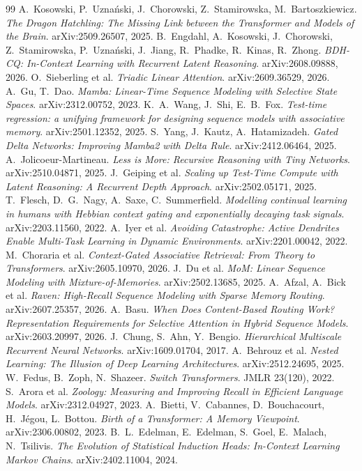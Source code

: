\documentclass[11pt]{article}
\begin{document}
\begin{thebibliography}{99}
\small
{} A.~Kosowski, P.~Uzna\'nski, J.~Chorowski, Z.~Stamirowska, M.~Bartoszkiewicz. \emph{The Dragon Hatchling: The Missing Link between the Transformer and Models of the Brain}. arXiv:2509.26507, 2025.
 B.~Engdahl, A.~Kosowski, J.~Chorowski, Z.~Stamirowska, P.~Uzna\'nski, J.~Jiang, R.~Phadke, R.~Kinas, R.~Zhong. \emph{BDH-CQ: In-Context Learning with Recurrent Latent Reasoning}. arXiv:2608.09888, 2026.
 O.~Sieberling et al. \emph{Triadic Linear Attention}. arXiv:2609.36529, 2026.
 A.~Gu, T.~Dao. \emph{Mamba: Linear-Time Sequence Modeling with Selective State Spaces}. arXiv:2312.00752, 2023.
 K.~A.~Wang, J.~Shi, E.~B.~Fox. \emph{Test-time regression: a unifying framework for designing sequence models with associative memory}. arXiv:2501.12352, 2025.
 S.~Yang, J.~Kautz, A.~Hatamizadeh. \emph{Gated Delta Networks: Improving Mamba2 with Delta Rule}. arXiv:2412.06464, 2025.
 A.~Jolicoeur-Martineau. \emph{Less is More: Recursive Reasoning with Tiny Networks}. arXiv:2510.04871, 2025.
 J.~Geiping et al. \emph{Scaling up Test-Time Compute with Latent Reasoning: A Recurrent Depth Approach}. arXiv:2502.05171, 2025.
 T.~Flesch, D.~G.~Nagy, A.~Saxe, C.~Summerfield. \emph{Modelling continual learning in humans with Hebbian context gating and exponentially decaying task signals}. arXiv:2203.11560, 2022.
 A.~Iyer et al. \emph{Avoiding Catastrophe: Active Dendrites Enable Multi-Task Learning in Dynamic Environments}. arXiv:2201.00042, 2022.
 M.~Choraria et al. \emph{Context-Gated Associative Retrieval: From Theory to Transformers}. arXiv:2605.10970, 2026.
 J.~Du et al. \emph{MoM: Linear Sequence Modeling with Mixture-of-Memories}. arXiv:2502.13685, 2025.
 A.~Afzal, A.~Bick et al. \emph{Raven: High-Recall Sequence Modeling with Sparse Memory Routing}. arXiv:2607.25357, 2026.
 A.~Basu. \emph{When Does Content-Based Routing Work? Representation Requirements for Selective Attention in Hybrid Sequence Models}. arXiv:2603.20997, 2026.
 J.~Chung, S.~Ahn, Y.~Bengio. \emph{Hierarchical Multiscale Recurrent Neural Networks}. arXiv:1609.01704, 2017.
 A.~Behrouz et al. \emph{Nested Learning: The Illusion of Deep Learning Architectures}. arXiv:2512.24695, 2025.
 W.~Fedus, B.~Zoph, N.~Shazeer. \emph{Switch Transformers}. JMLR 23(120), 2022.
 S.~Arora et al. \emph{Zoology: Measuring and Improving Recall in Efficient Language Models}. arXiv:2312.04927, 2023.
 A.~Bietti, V.~Cabannes, D.~Bouchacourt, H.~J\'egou, L.~Bottou. \emph{Birth of a Transformer: A Memory Viewpoint}. arXiv:2306.00802, 2023.
 B.~L.~Edelman, E.~Edelman, S.~Goel, E.~Malach, N.~Tsilivis. \emph{The Evolution of Statistical Induction Heads: In-Context Learning Markov Chains}. arXiv:2402.11004, 2024.
\end{thebibliography}
\end{document}

